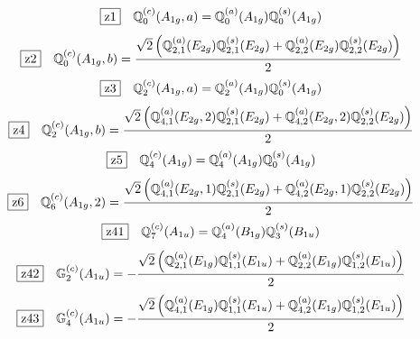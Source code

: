 \documentclass[fleqn,10pt,landscape]{jsarticle}
\begin{document}
\begin{dmath*}
\hspace*{3mm}\fbox{z1}\quad \mathbb{Q}_{0}^{(c)}(A_{1g},a)=\mathbb{Q}_{0}^{(a)}(A_{1g}) \mathbb{Q}_{0}^{(s)}(A_{1g})
\end{dmath*}
\begin{dmath*}
\hspace*{3mm}\fbox{z2}\quad \mathbb{Q}_{0}^{(c)}(A_{1g},b)=\frac{\sqrt{2} \left(\mathbb{Q}_{2,1}^{(a)}(E_{2g}) \mathbb{Q}_{2,1}^{(s)}(E_{2g}) + \mathbb{Q}_{2,2}^{(a)}(E_{2g}) \mathbb{Q}_{2,2}^{(s)}(E_{2g})\right)}{2}
\end{dmath*}
\begin{dmath*}
\hspace*{3mm}\fbox{z3}\quad \mathbb{Q}_{2}^{(c)}(A_{1g},a)=\mathbb{Q}_{2}^{(a)}(A_{1g}) \mathbb{Q}_{0}^{(s)}(A_{1g})
\end{dmath*}
\begin{dmath*}
\hspace*{3mm}\fbox{z4}\quad \mathbb{Q}_{2}^{(c)}(A_{1g},b)=\frac{\sqrt{2} \left(\mathbb{Q}_{4,1}^{(a)}(E_{2g},2) \mathbb{Q}_{2,1}^{(s)}(E_{2g}) + \mathbb{Q}_{4,2}^{(a)}(E_{2g},2) \mathbb{Q}_{2,2}^{(s)}(E_{2g})\right)}{2}
\end{dmath*}
\begin{dmath*}
\hspace*{3mm}\fbox{z5}\quad \mathbb{Q}_{4}^{(c)}(A_{1g})=\mathbb{Q}_{4}^{(a)}(A_{1g}) \mathbb{Q}_{0}^{(s)}(A_{1g})
\end{dmath*}
\begin{dmath*}
\hspace*{3mm}\fbox{z6}\quad \mathbb{Q}_{6}^{(c)}(A_{1g},2)=\frac{\sqrt{2} \left(\mathbb{Q}_{4,1}^{(a)}(E_{2g},1) \mathbb{Q}_{2,1}^{(s)}(E_{2g}) + \mathbb{Q}_{4,2}^{(a)}(E_{2g},1) \mathbb{Q}_{2,2}^{(s)}(E_{2g})\right)}{2}
\end{dmath*}
\begin{dmath*}
\hspace*{3mm}\fbox{z41}\quad \mathbb{Q}_{7}^{(c)}(A_{1u})=\mathbb{Q}_{4}^{(a)}(B_{1g}) \mathbb{Q}_{3}^{(s)}(B_{1u})
\end{dmath*}
\begin{dmath*}
\hspace*{3mm}\fbox{z42}\quad \mathbb{G}_{2}^{(c)}(A_{1u})=- \frac{\sqrt{2} \left(\mathbb{Q}_{2,1}^{(a)}(E_{1g}) \mathbb{Q}_{1,1}^{(s)}(E_{1u}) + \mathbb{Q}_{2,2}^{(a)}(E_{1g}) \mathbb{Q}_{1,2}^{(s)}(E_{1u})\right)}{2}
\end{dmath*}
\begin{dmath*}
\hspace*{3mm}\fbox{z43}\quad \mathbb{G}_{4}^{(c)}(A_{1u})=- \frac{\sqrt{2} \left(\mathbb{Q}_{4,1}^{(a)}(E_{1g}) \mathbb{Q}_{1,1}^{(s)}(E_{1u}) + \mathbb{Q}_{4,2}^{(a)}(E_{1g}) \mathbb{Q}_{1,2}^{(s)}(E_{1u})\right)}{2}
\end{dmath*}
\end{document}
